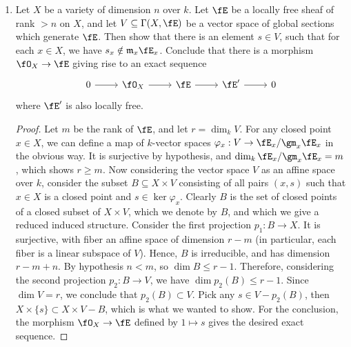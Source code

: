 \documentclass[a4paper]{article}
\begin{document}
\begin{enumerate} [label=\textbf{\arabic*.}, leftmargin=0em]
\begin{proof}
\begin{itemize} [leftmargin=0cm]
                  \item[(d)] Follows from (c) and (Ex. 5.7a).

              \end{itemize}
          \end{proof}

    \item[\textbf{2.}] Let $X$ be a variety of dimension $n$ over $k$. Let $\fE$ be a locally free sheaf of rank $> n$ on $X$, and let $V \subseteq \Gamma(X, \fE)$ be a vector space of global sections which generate $\fE$. Then show that there is an element $s \in V$, such that for each $x \in X$, we have $s_x \notin \goth{m}_x \fE_x$. Conclude that there is a morphism $\fO_X \to \fE$ giving rise to an exact sequence
          \[ \begin{tikzcd}
                  0 \arrow[r] & \fO_X \arrow[r] & \fE \arrow[r] & \fE' \arrow[r] & 0
              \end{tikzcd} \]
          where $\fE'$ is also locally free.

          \begin{proof}
              Let $m$ be the rank of $\fE$, and let $r = \dim_k{V}$.
              For any closed point $x \in X$, we can define a map of $k$-vector spaces $\varphi_x : V \to \fE_x / \gm_x \fE_x$ in the obvious way.
              It is surjective by hypothesis, and $\dim_k \fE_x / \gm_x \fE_x = m$, which shows $r \geq m$.
              Now considering the vector space $V$ as an affine space over $k$, consider the subset $B \subseteq X \times V$ consisting of all pairs $(x, s)$ such that $x \in X$ is a closed point and $s \in \ker{\varphi_x}$.
              Clearly $B$ is the set of closed points of a closed subset of $X \times V$, which we denote by $B$, and which we give a reduced induced structure.
              Consider the first projection $p_1 : B \to X$.
              It is surjective, with fiber an affine space of dimension $r - m$ (in particular, each fiber is a linear subspace of $V$).
              Hence, $B$ is irreducible, and has dimension $r - m + n$. By hypothesis $n < m$, so $\dim{B} \leq r - 1$.
              Therefore, considering the second projection $p_2 : B \to V$, we have $\dim p_2(B) \leq r - 1$.
              Since $\dim{V} = r$, we conclude that $p_2(B) \subset V$.
              Pick any $s \in V - p_2(B)$, then $X \times \{s\} \subset X \times V - B$, which is what we wanted to show.
              For the conclusion, the morphism $\fO_X \to \fE$ defined by $1 \mapsto s$ gives the desired exact sequence.
          \end{proof}


\end{enumerate}
\end{document}
